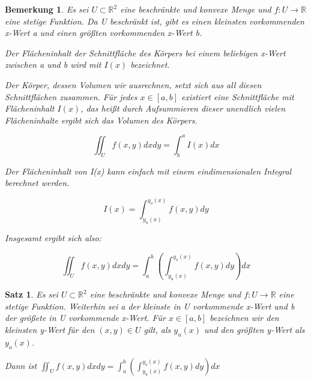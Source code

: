 \documentclass[12pt,a4paper]{scrreprt}
\newtheorem{bemerkung}[defi]{Bemerkung}
\newtheorem{satz}[defi]{Satz}
\begin{document}
	\begin{bemerkung}

		Es sei $U\subset\mathbb{R}^2$ eine beschränkte und konvexe Menge und $f:U\to\mathbb{R}$ eine stetige Funktion. Da U beschränkt ist, gibt es einen kleinsten vorkommenden x-Wert a und einen größten vorkommenden x-Wert b.

		Der Flächeninhalt der Schnittfläche des Körpers bei einem beliebigen x-Wert zwischen a und b wird mit $I(x)$ bezeichnet.

		Der Körper, dessen Volumen wir ausrechnen, setzt sich aus all diesen Schnittflächen zusammen. Für jedes $x\in [a,b]$ existiert eine Schnittfläche mit Flächeninhalt $I(x)$, das heißt durch Aufsummieren dieser unendlich vielen Flächeninhalte ergibt sich das Volumen des Körpers.

		\[\iint_U f(x,y)dxdy = \int^a_b I(x)dx\]

		Der Flächeninhalt von I(x) kann einfach mit einem eindimensionalen Integral berechnet werden.

		\[I(x) = \int^{y_o(x)}_{y_u(x)} f(x,y)dy \]

		Insgesamt ergibt sich also:

		\[\iint_U f(x,y)dxdy = \int^b_a \left(\int^{y_o(x)}_{y_u(x)} f(x,y)dy\right)dx\]
	\end{bemerkung}

	\begin{satz}
		Es sei $U\subset\mathbb{R}^2$ eine beschränkte und konvexe Menge und $f:U\to\mathbb{R}$ eine stetige Funktion. Weiterhin sei a der kleinste in U vorkommende x-Wert und b der größete in U vorkommende x-Wert. Für $x\in [a,b]$ bezeichnen wir den kleinsten y-Wert für den $(x,y) \in U$ gilt, als $y_u(x)$ und den größten y-Wert als $y_o(x)$.

		Dann ist $\iint_U f(x,y)dxdy = \int^b_a \left(\int^{y_o(x)}_{y_u(x)} f(x,y)dy\right)dx$
	\end{satz}
\end{document}
